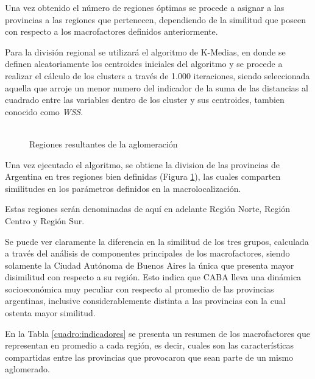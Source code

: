 \documentclass[12pt,a4paper]{article}
\begin{document}
Una vez obtenido el número de regiones óptimas se procede a asignar a las provincias a las regiones que pertenecen, dependiendo de la similitud que poseen con respecto a los macrofactores definidos anteriormente.

Para la división regional se utilizará el algoritmo de K-Medias, en donde se definen aleatoriamente los centroides iniciales del algoritmo y se procede a realizar el cálculo de los clusters a través de 1.000 iteraciones, siendo seleccionada aquella  que arroje un menor numero del indicador de la suma de las distancias al cuadrado entre las variables dentro de  los cluster y sus centroides, tambien conocido como \textit{WSS}.

\begin{figure}[htbp!]
\begin{center}
\caption{\\Regiones resultantes de la aglomeración}

\label{figure:reg_resultantes}
\end{center}
\end{figure}

Una vez ejecutado el algoritmo, se obtiene la division de las provincias de Argentina en tres regiones bien definidas (Figura \ref{figure:reg_resultantes}), las cuales comparten similitudes en los parámetros definidos en la macrolocalización.

Estas regiones serán denominadas de aquí en adelante Región Norte, Región Centro y Región Sur.

Se puede ver claramente la diferencia en la similitud de los tres grupos, calculada a través del análisis de componentes principales de los macrofactores, siendo solamente la Ciudad Autónoma de Buenos Aires la única que presenta mayor disimilitud con respecto a su región.
Esto indica que CABA  lleva una dinámica socioeconómica muy peculiar con respecto al promedio de las provincias argentinas, inclusive considerablemente distinta a las provincias con la cual ostenta mayor similitud.

En la Tabla \ref{cuadro:indicadores} se presenta un resumen de los macrofactores que representan en promedio a cada región, es decir, cuales son las características compartidas entre las provincias que provocaron que sean parte de un mismo aglomerado.
\end{document}
